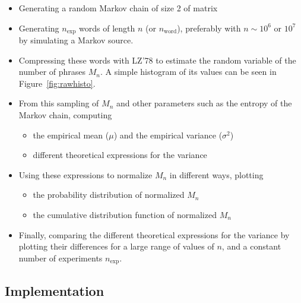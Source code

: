 \begin{itemize}[nosep]
	\item Generating a random Markov chain of size 2 of matrix

	\item Generating $n_{\text{exp}}$ words of length 
	$n $ (or $n_{\text{word}}$), preferably with $n \sim 10^6 \text{ or } 10^7$
	by simulating a Markov source.
	
	\item Compressing these words with LZ'78 to estimate the random variable of
	the number of phrases $M_n$. A simple histogram of its values
	can be seen in Figure~\ref{fig:rawhisto}.
	
	\item From this sampling of  $M_n$ and other parameters such as the entropy
	of the Markov chain, computing
 
		\begin{itemize}[nosep]
			\item the empirical mean ($\mu$) and the empirical variance ($\sigma^2$)
			\item different theoretical expressions for the variance
		\end{itemize}
 	
	\item Using these expressions to normalize $M_n$ in different ways, plotting
	
		\begin{itemize}[nosep]
			\item the probability distribution of normalized $M_n$ 
				
			\item the cumulative distribution function of normalized $M_n$
		\end{itemize}
 
	\item Finally, comparing the different theoretical expressions for the variance 
	by plotting their differences for a large range of values of $n$, and
	a constant number of experiments $n_{\text{exp}}$.
\end{itemize}

\subsection{ Implementation }

